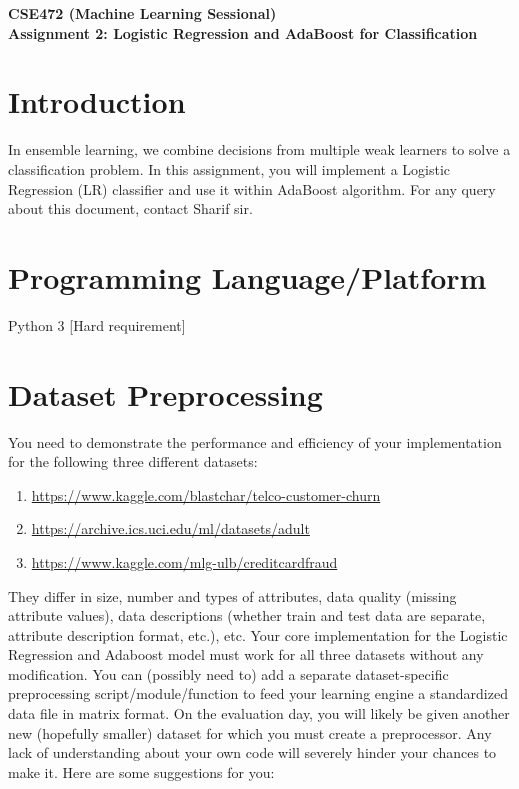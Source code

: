 \documentclass[11pt, a4paper]{article}
\begin{document}
\begin{center}
    \textbf{\Large CSE472 (Machine Learning Sessional)} \\[0.5em]
    \textbf{Assignment 2: Logistic Regression and AdaBoost for Classification}
\end{center}

\vspace{1em}

\section{Introduction}
In ensemble learning, we combine decisions from multiple weak learners to solve a classification problem. In this assignment, you will implement a Logistic Regression (LR) classifier and use it within AdaBoost algorithm. For any query about this document, contact Sharif sir.

\section{Programming Language/Platform}
Python 3 [Hard requirement]

\section{Dataset Preprocessing}
You need to demonstrate the performance and efficiency of your implementation for the following three different datasets:
\begin{enumerate}
    \item \url{https://www.kaggle.com/blastchar/telco-customer-churn}
    \item \url{https://archive.ics.uci.edu/ml/datasets/adult}
    \item \url{https://www.kaggle.com/mlg-ulb/creditcardfraud}
\end{enumerate}

They differ in size, number and types of attributes, data quality (missing attribute values), data descriptions (whether train and test data are separate, attribute description format, etc.), etc. Your core implementation for the Logistic Regression and Adaboost model must work for all three datasets without any modification. You can (possibly need to) add a separate dataset-specific preprocessing script/module/function to feed your learning engine a standardized data file in matrix format. On the evaluation day, you will likely be given another new (hopefully smaller) dataset for which you must create a preprocessor. Any lack of understanding about your own code will severely hinder your chances to make it. Here are some suggestions for you:
\end{document}
